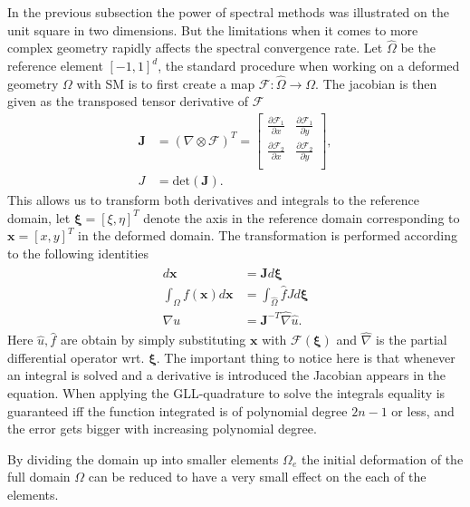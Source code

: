 In the previous subsection the power of spectral methods was illustrated on the unit square in two dimensions.
But the limitations when it comes to more complex geometry rapidly affects the spectral convergence rate. 
Let $\hat{\Omega}$ be the reference element $[-1,1]^d$,
the standard procedure when working on a deformed geometry $\Omega$ with SM is to first create a map $\mathcal{F}:\hat{\Omega}\rightarrow\Omega$.
The jacobian is then given as the transposed tensor derivative of $\mathcal{F}$
\begin{align}
    \mathbf{J} &= (\nabla \otimes \mathcal{F})^T =
\begin{bmatrix}
    \frac{\partial \mathcal{F}_1}{\partial x} &  \frac{\partial \mathcal{F}_1}{\partial y}  \\ 	
	\frac{\partial \mathcal{F}_2}{\partial x} &  \frac{\partial \mathcal{F}_2}{\partial y} \\ 	
\end{bmatrix},\\
J &= \text{det}(\mathbf{J}).
    \label{eq:jaobian}
\end{align}
This allows us to transform both derivatives and integrals to the reference domain, let $\boldsymbol\xi = [\xi,\eta]^T$ denote the axis in the reference 
domain corresponding to $\mathbf{x} = [x,y]^T$ in the deformed domain. The transformation is performed according to the following identities
\begin{align}
    \begin{split}
        d\mathbf{x} &= \mathbf{J}d\boldsymbol\xi \\
        \int_{\Omega}f(\mathbf{x})d\mathbf{x} &= \int_{\hat\Omega}\hat f J d\boldsymbol\xi \\
        \nabla u &= \mathbf{J}^{-T}\hat\nabla \hat u.
    \end{split}
    \label{eq:transforms}
\end{align}
Here $\hat u,\hat f$ are obtain by simply substituting $\mathbf{x}$ with $\mathcal{F}(\boldsymbol{\xi})$ and $\hat \nabla $ is the partial 
differential operator wrt. $\boldsymbol\xi$. The important thing to notice here is that whenever an integral is solved and a derivative is 
introduced the Jacobian appears in the equation. When applying the GLL-quadrature to solve the integrals equality is guaranteed iff the 
function integrated is of polynomial degree $2n-1$ or less, and the error gets bigger with increasing polynomial degree.

By dividing the domain up into smaller elements ${\Omega_e}$ the initial deformation of the full domain $\Omega$ 
can be reduced to have a very small effect on the each of the elements.

